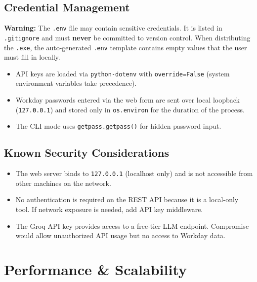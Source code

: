 \documentclass[12pt,a4paper]{article}
\begin{document}
\subsection{Credential Management}
\label{subsec:credential-mgmt}

\begin{warningbox}
\textbf{Warning:} The \texttt{.env} file may contain sensitive credentials. It is listed in \texttt{.gitignore} and must \textbf{never} be committed to version control. When distributing the \texttt{.exe}, the auto-generated \texttt{.env} template contains empty values that the user must fill in locally.
\end{warningbox}

\begin{itemize}[leftmargin=2em]
  \item API keys are loaded via \texttt{python-dotenv} with \texttt{override=False} (system environment variables take precedence).
  \item Workday passwords entered via the web form are sent over local loopback (\texttt{127.0.0.1}) and stored only in \texttt{os.environ} for the duration of the process.
  \item The CLI mode uses \texttt{getpass.getpass()} for hidden password input.
\end{itemize}

\subsection{Known Security Considerations}
\label{subsec:security-considerations}

\begin{itemize}[leftmargin=2em]
  \item The web server binds to \texttt{127.0.0.1} (localhost only) and is not accessible from other machines on the network.
  \item No authentication is required on the REST API because it is a local-only tool. If network exposure is needed, add API key middleware.
  \item The Groq API key provides access to a free-tier LLM endpoint. Compromise would allow unauthorized API usage but no access to Workday data.
\end{itemize}

\section{Performance \& Scalability}
\label{sec:performance}
\end{document}
